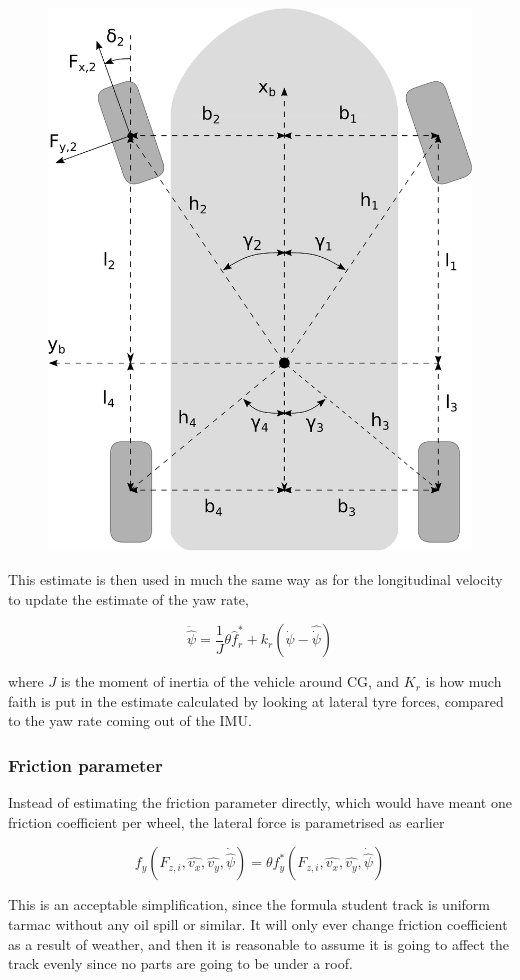 \begin{figure}
    \centering
    \includegraphics[width=0.5\linewidth]{0_Images/3_Theory/TorqueCalculations.eps}
    \label{Fig:WheelTorques}
\end{figure}

This estimate is then used in much the same way as for the longitudinal velocity to update the estimate of the yaw rate,

\begin{equation}
    \ddot{\hat{\psi}} = \frac{1}{J}\theta \hat{f}_r^* + k_r(\dot{\psi}-\hat{\dot{\psi}})
\end{equation}

where $J$ is the moment of inertia of the vehicle around CG, and $K_r$ is how much faith is put in the estimate calculated by looking at lateral tyre forces, compared to the yaw rate coming out of the IMU. 

\subsubsection{Friction parameter}
Instead of estimating the friction parameter directly, which would have meant one friction coefficient per wheel, the lateral force is parametrised as earlier

\begin{equation}
    f_y(F_{z,i}, \hat{v_x}, \hat{v_y}, \dot{\hat{\psi}}) =\theta f_y^*(F_{z,i}, \hat{v_x}, \hat{v_y}, \dot{\hat{\psi}}) 
\end{equation}

This is an acceptable simplification, since the formula student track is uniform tarmac without any oil spill or similar. It will only ever change friction coefficient as a result of weather, and then it is reasonable to assume it is going to affect the track evenly since no parts are going to be under a roof. 

